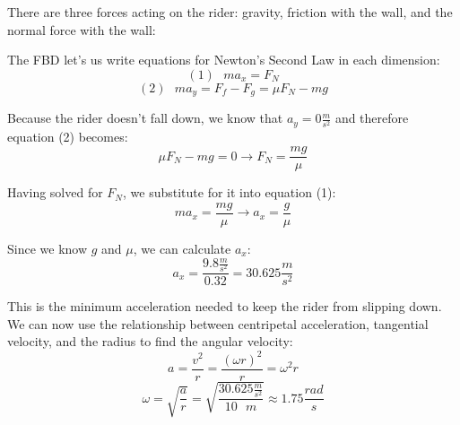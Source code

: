 \begin{Answer}[ref = gravitron]
There are three forces acting on the rider: gravity, friction with the wall, and the normal force with the wall:

\begin{center}
\end{center}

The FBD let's us write equations for Newton's Second Law in each dimension:
$$\left( 1 \right) \text{ }ma_x = F_N$$
$$\left( 2 \right) \text{ }ma_y = F_f - F_g = \mu F_N - mg$$

Because the rider doesn't fall down, we know that $a_y = 0 \frac{m}{s^2}$ and therefore equation (2) becomes:
$$\mu F_N - mg = 0 \to F_N = \frac{mg}{\mu}$$

Having solved for $F_N$, we substitute for it into equation (1):
$$ma_x = \frac{mg}{\mu} \to a_x = \frac{g}{\mu}$$

Since we know $g$ and $\mu$, we can calculate $a_x$:
$$a_x = \frac{9.8 \frac{m}{s^2}}{0.32} = 30.625 \frac{m}{s^2}$$

This is the minimum acceleration needed to keep the rider from slipping down. We can now use the relationship between centripetal acceleration, tangential velocity, and the radius to find the angular velocity:
$$a = \frac{v^2}{r} = \frac{\left( \omega r \right)^2}{r} = \omega^2 r$$
$$\omega = \sqrt{\frac{a}{r}} = \sqrt{\frac{30.625 \frac{m}{s^2}}{10 \text{ } m}} \approx 1.75 \frac{rad}{s}$$
\end{Answer}
